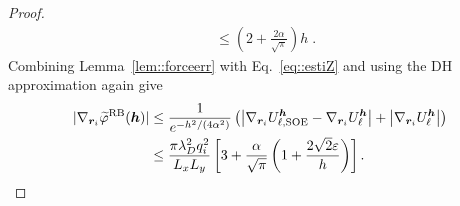 \begin{proof}
\begin{equation}
\begin{split}
			& \leq \left(2 + \frac{2\alpha}{\sqrt{\pi}} \right) h\;.
		\end{split}
	\end{equation}
	Combining Lemma~\ref{lem::forceerr} with Eq.~\eqref{eq::estiZ} and using the DH approximation again give
	\begin{equation}
		\begin{split}
			\lvert \nabla_{\bm{r}_i}\widetilde{\varphi}^{\text{RB}}(\bm{h})\rvert&\leq \frac{1}{e^{-h^2/(4\alpha^2)}}\left(\left|\nabla_{\bm{r}_i}U_{\ell,\text{SOE}}^{\bm{h}}-\nabla_{\bm{r}_i}U_{\ell}^{\bm{h}}\right|+\left|\nabla_{\bm{r}_i}U_{\ell}^{\bm{h}}\right|\right)\\
			&\leq \frac{\pi \lambda_D^2 q_{i}^2}{L_xL_y}\left[3+\frac{\alpha}{\sqrt{\pi}}\left(1+\frac{2\sqrt{2}\varepsilon}{h}\right)\right].
		\end{split}
	\end{equation}
\end{proof}

